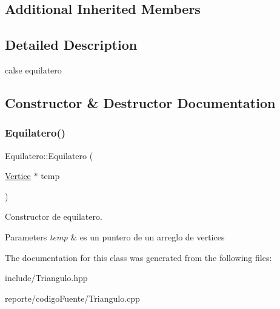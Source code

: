 \subsection*{Additional Inherited Members}


\subsection{Detailed Description}
calse equilatero 

\subsection{Constructor \& Destructor Documentation}
\mbox{\label{class_equilatero_a27bc291f53fa7dfa9a4cc3617bca5ecf}} 
\subsubsection{\texorpdfstring{Equilatero()}{Equilatero()}}
{\footnotesize\ttfamily Equilatero\+::\+Equilatero (\begin{DoxyParamCaption}\item[{\hyperlink{class_vertice}{Vertice} $\ast$}]{temp }\end{DoxyParamCaption})}



Constructor de equilatero. 


\begin{DoxyParams}{Parameters}
{\em temp} & es un puntero de un arreglo de vertices \\
\hline
\end{DoxyParams}


The documentation for this class was generated from the following files\+:\begin{DoxyCompactItemize}
\item 
include/Triangulo.\+hpp\item 
reporte/codigo\+Fuente/Triangulo.\+cpp\end{DoxyCompactItemize}
